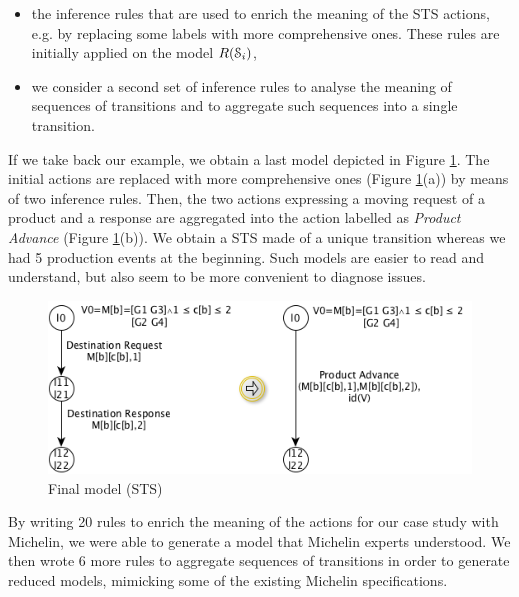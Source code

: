 \begin{itemize}
    \item the inference rules that are used to enrich the meaning
    of the STS actions, e.g. by replacing some labels with more
    comprehensive ones. These rules are initially applied on the
    model $R(\EuScript{S}_i)$,

    \item we consider a second set of inference rules to analyse
    the meaning of sequences of transitions and to aggregate such
    sequences into a single transition.
\end{itemize}

If we take back our example, we obtain a last model depicted in
Figure \ref{fig:finalmodel}. The initial actions are replaced
with more comprehensive ones (Figure \ref{fig:finalmodel}(a)) by
means of two inference rules. Then, the two actions expressing a
moving request of a product and a response are aggregated into
the action labelled as \textit{Product Advance} (Figure
\ref{fig:finalmodel}(b)). We obtain a STS made of a unique
transition whereas we had 5 production events at the beginning.
Such models are easier to read and understand, but also seem to
be more convenient to diagnose issues.

\begin{figure}[H]
	\begin{center}
    \includegraphics[width=1.0\linewidth]{figures/STSfinal.png}
	\end{center}

	\caption{Final model (STS)}
	\label{fig:finalmodel}
\end{figure}

By writing 20 rules to enrich the meaning of the actions for our
case study with Michelin, we were able to generate a model that
Michelin experts understood. We then wrote 6 more rules to
aggregate sequences of transitions in order to generate reduced
models, mimicking some of the existing Michelin specifications.

